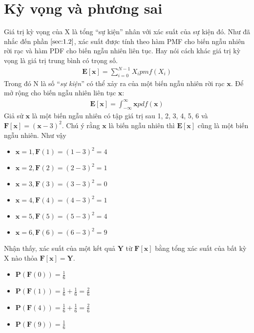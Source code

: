 \section{Kỳ vọng và phương sai}\label{sec:1.3}
Giá trị kỳ vọng của X là tổng “sự kiện” nhân với xác suất của sự kiện đó. Như đã nhắc đến phần $ \ref{sec:1.2} $, 
xác suất được tính theo hàm PMF cho biến ngẫu nhiên rời rạc và hàm PDF cho biến ngẫu nhiên liên tục. 
Hay nói cách khác giá trị kỳ vọng là giá trị trung bình có trọng số.
\begin{align}
	\textbf{E}[\textbf{x}]=\sum_{i=0}^{N-1}{X_ipmf(X_i)}
\end{align}
Trong đó N là số “\textit{sự kiện}” có thể xảy ra của một biến ngẫu nhiên rời rạc $\textbf{x}$. 
Để mở rộng cho biến ngẫu nhiên liên tục $\textbf{x}$: 
\begin{align}
	\textbf{E}[\textbf{x}]=\int_{-\infty}^{\infty}{\textbf{x}pdf(\textbf{x})}
\end{align}
Giả sử $\textbf{x}$ là một biến ngẫu nhiên có tập giá trị sau {1, 2, 3, 4, 5, 6} và $\textbf{F}[\textbf{x}]=(\textbf{x}-3)^2$. Chú ý rằng  $\textbf{x}$ là biến ngẫu nhiên thì $\textbf{E}[\textbf{x}]$ cũng là một biến ngẫu nhiên.
Như vậy
\begin{itemize}
	\centering
	\item $\textbf{x}=1,\textbf{F}(1)=(1-3)^2=4$
	\item $\textbf{x}=2,\textbf{F}(2)=(2-3)^2=1$
	\item $\textbf{x}=3,\textbf{F}(3)=(3-3)^2=0$
	\item $\textbf{x}=4,\textbf{F}(4)=(4-3)^2=1$
	\item $\textbf{x}=5,\textbf{F}(5)=(5-3)^2=4$
	\item $\textbf{x}=6,\textbf{F}(6)=(6-3)^2=9$
\end{itemize}
Nhận thấy, xác suất của một kết quả $\textbf{Y}$ từ $\textbf{F}[\textbf{x}]$ bằng tổng xác suất của bất kỳ X nào thỏa $\textbf{F}[\textbf{x}]=\textbf{Y}$.

\begin{itemize}
	\centering
	\item $\textbf{P}(\textbf{F}(0))=\frac{1}{6}$
	\item $\textbf{P}(\textbf{F}(1))=\frac{1}{6}+\frac{1}{6}=\frac{2}{6}$
	\item $\textbf{P}(\textbf{F}(4))=\frac{1}{6}+\frac{1}{6}=\frac{2}{6}$
	\item $\textbf{P}(\textbf{F}(9))=\frac{1}{6}$
\end{itemize}

